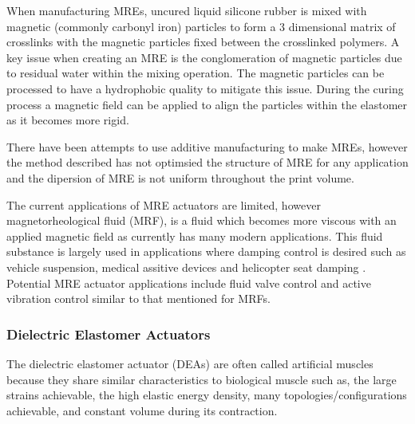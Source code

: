 When manufacturing MREs, uncured liquid silicone rubber is mixed with magnetic (commonly carbonyl iron) particles to form a 3 dimensional matrix of crosslinks with the magnetic particles fixed between the crosslinked polymers. A key issue when creating an MRE is the conglomeration of magnetic particles due to residual water within the mixing operation. The magnetic particles can be processed to have a hydrophobic quality to mitigate this issue. During the curing process a magnetic field can be applied to align the particles within the elastomer as it becomes more rigid.

There have been attempts to use additive manufacturing to make MREs\citep{Krueger2014}, however the method described has not optimsied the structure of MRE for any application and the dipersion of MRE is not uniform throughout the print volume.

The current applications of MRE actuators are limited, however magnetorheological fluid (MRF), is a fluid which becomes more viscous with an applied magnetic field as currently has many modern applications. This fluid substance is largely used in applications where damping control is desired such as vehicle suspension\citep{UnuhH2019}, medical assitive devices\citep{Chen2017} and helicopter seat damping \citep{Hiemenz2007}. Potential MRE actuator applications include fluid valve control\citep{Bose2012} and active vibration control similar to that mentioned for MRFs\citep{UnuhH2019}.


\subsubsection{Dielectric Elastomer Actuators}
The dielectric elastomer actuator (DEAs) are often called artificial muscles because they share similar characteristics to biological muscle such as, the large strains achievable, the high elastic energy density, many topologies/configurations achievable, and constant volume during its contraction.

